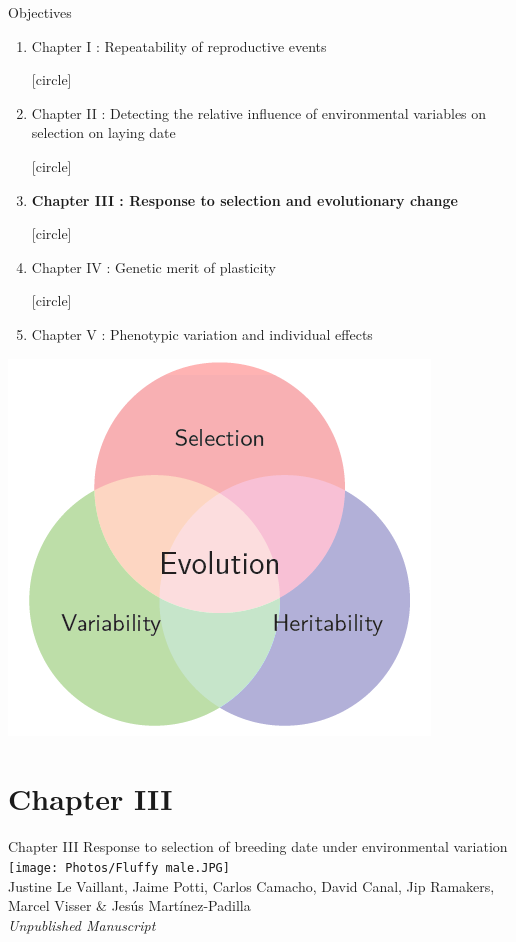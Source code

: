 \documentclass[compress]{beamer}
\begin{document}
\begin{frame}{Objectives}
   \begin{enumerate}
  [circle]
\item \normalsize Chapter I : Repeatability of reproductive events
\vspace{0.3cm}

  [circle]
\item \normalsize Chapter II : Detecting the relative influence of environmental variables on selection on laying date  
\vspace{0.3cm}

  [circle]
\item \normalsize \textbf{Chapter III : Response to selection and evolutionary change}
\vspace{0.3cm}

  [circle]
\item \normalsize Chapter IV : Genetic merit of plasticity 
\vspace{0.3cm}

  [circle]
\item \normalsize Chapter V : Phenotypic variation and individual effects
\end{enumerate}

\vspace{0.3cm}
\centering
  \includegraphics[height = 3.5 cm]{Image/evolution.png} 

\end{frame}
\section{Chapter III}
\begin{frame}{Chapter III}
\centering 
\large{Response to selection of breeding date under environmental variation} \\
\vfill
\texttt{[image: Photos/Fluffy male.JPG]}\\
Justine Le Vaillant, Jaime Potti, Carlos Camacho, David Canal, Jip Ramakers, Marcel Visser \& Jes\'{u}s Mart\'{i}nez-Padilla \\
\vfill \small{\textit{Unpublished Manuscript}
}

\end{frame}
\end{document}
